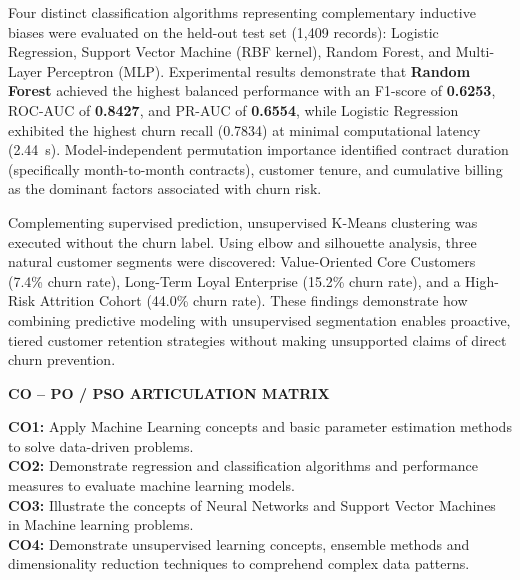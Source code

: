\documentclass[12pt,a4paper]{report}
\newcommand{\datasetTestCount}{1,409}
\newcommand{\bestModelName}{Random Forest}
\newcommand{\bestModelFOne}{0.6253}
\newcommand{\bestModelRocAuc}{0.8427}
\newcommand{\bestModelPrAuc}{0.6554}
\newcommand{\LogisticRegressionRec}{0.7834}
\newcommand{\LogisticRegressionTime}{2.44}
\begin{document}
Four distinct classification algorithms representing complementary inductive biases were evaluated on the held-out test set (\datasetTestCount{} records): Logistic Regression, Support Vector Machine (RBF kernel), Random Forest, and Multi-Layer Perceptron (MLP). Experimental results demonstrate that \textbf{\bestModelName{}} achieved the highest balanced performance with an F1-score of \textbf{\bestModelFOne{}}, ROC-AUC of \textbf{\bestModelRocAuc{}}, and PR-AUC of \textbf{\bestModelPrAuc{}}, while Logistic Regression exhibited the highest churn recall (\LogisticRegressionRec{}) at minimal computational latency (\LogisticRegressionTime{}~s). Model-independent permutation importance identified contract duration (specifically month-to-month contracts), customer tenure, and cumulative billing as the dominant factors associated with churn risk. 

Complementing supervised prediction, unsupervised K-Means clustering was executed without the churn label. Using elbow and silhouette analysis, three natural customer segments were discovered: Value-Oriented Core Customers (7.4\% churn rate), Long-Term Loyal Enterprise (15.2\% churn rate), and a High-Risk Attrition Cohort (44.0\% churn rate). These findings demonstrate how combining predictive modeling with unsupervised segmentation enables proactive, tiered customer retention strategies without making unsupported claims of direct churn prevention.

\vspace{0.6cm}
\begin{center}
    {\bfseries\large CO -- PO / PSO ARTICULATION MATRIX\par}
\end{center}
\vspace{0.1cm}

\noindent \textbf{CO1:} Apply Machine Learning concepts and basic parameter estimation methods to solve data-driven problems.\\
\textbf{CO2:} Demonstrate regression and classification algorithms and performance measures to evaluate machine learning models.\\
\textbf{CO3:} Illustrate the concepts of Neural Networks and Support Vector Machines in Machine learning problems.\\
\textbf{CO4:} Demonstrate unsupervised learning concepts, ensemble methods and dimensionality reduction techniques to comprehend complex data patterns.
\end{document}
